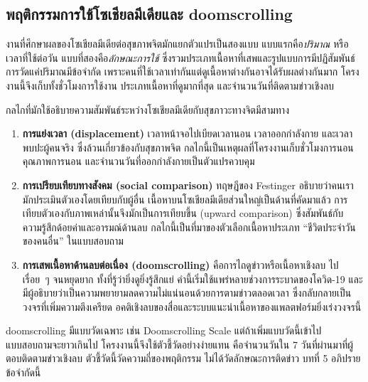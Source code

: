 \subsection{พฤติกรรมการใช้โซเชียลมีเดียและ doomscrolling}

งานที่ศึกษาผลของโซเชียลมีเดียต่อสุขภาพจิตมักแยกตัวแปรเป็นสองแบบ
แบบแรกคือ\textit{ปริมาณ} หรือเวลาที่ใช้ต่อวัน แบบที่สองคือ\textit{ลักษณะการใช้}
ซึ่งรวมประเภทเนื้อหาที่เสพและรูปแบบการมีปฏิสัมพันธ์
การวัดแค่ปริมาณมีข้อจำกัด เพราะคนที่ใช้เวลาเท่ากันแต่ดูเนื้อหาต่างกันอาจได้รับผลต่างกันมาก
โครงงานนี้จึงเก็บทั้งชั่วโมงการใช้งาน ประเภทเนื้อหาที่ดูมากที่สุด และจำนวนวันที่ติดตามข่าวเชิงลบ

กลไกที่มักใช้อธิบายความสัมพันธ์ระหว่างโซเชียลมีเดียกับสุขภาวะทางจิตมีสามทาง

\begin{enumerate}[label=\arabic*),leftmargin=1.9cm,itemsep=0.15em,topsep=0.2em]
    \item \textbf{การแย่งเวลา (displacement)} เวลาหน้าจอไปเบียดเวลานอน เวลาออกกำลังกาย
          และเวลาพบปะผู้คนจริง ซึ่งล้วนเกี่ยวข้องกับสุขภาพจิต
          กลไกนี้เป็นเหตุผลที่โครงงานเก็บชั่วโมงการนอน คุณภาพการนอน และจำนวนวันที่ออกกำลังกายเป็นตัวแปรควบคุม
    \item \textbf{การเปรียบเทียบทางสังคม (social comparison)} ทฤษฎีของ Festinger
          \cite{festinger1954social} อธิบายว่าคนเรามักประเมินตัวเองโดยเทียบกับผู้อื่น
          เนื้อหาบนโซเชียลมีเดียส่วนใหญ่เป็นด้านที่คัดมาแล้ว
          การเทียบตัวเองกับภาพเหล่านั้นจึงมักเป็นการเทียบขึ้น (upward comparison)
          ซึ่งสัมพันธ์กับความรู้สึกด้อยค่าและอารมณ์ด้านลบ
          กลไกนี้เป็นที่มาของตัวเลือกเนื้อหาประเภท ``ชีวิตประจำวันของคนอื่น'' ในแบบสอบถาม
    \item \textbf{การเสพเนื้อหาด้านลบต่อเนื่อง (doomscrolling)} คือการไถดูข่าวหรือเนื้อหาเชิงลบ
          ไปเรื่อย~ๆ จนหยุดยาก ทั้งที่รู้ว่ายิ่งดูยิ่งรู้สึกแย่
          คำนี้เริ่มใช้แพร่หลายช่วงการระบาดของโควิด-19
          และมีผู้อธิบายว่าเป็นความพยายามลดความไม่แน่นอนด้วยการตามข่าวตลอดเวลา
          ซึ่งกลับกลายเป็นวงจรที่เพิ่มความตึงเครียด
          อคติเชิงลบของสื่อและระบบแนะนำเนื้อหาของแพลตฟอร์มยิ่งเร่งวงจรนี้
\end{enumerate}

\noindent
doomscrolling มีแบบวัดเฉพาะ เช่น Doomscrolling Scale
แต่ถ้าเพิ่มแบบวัดนี้เข้าไป แบบสอบถามจะยาวเกินไป
โครงงานนี้จึงใช้ตัวชี้วัดอย่างง่ายแทน คือจำนวนวันใน 7 วันที่ผ่านมาที่ผู้ตอบติดตามข่าวเชิงลบ
ตัวชี้วัดนี้วัดความถี่ของพฤติกรรม ไม่ได้วัดลักษณะการติดข่าว
บทที่ 5 อภิปรายข้อจำกัดนี้

